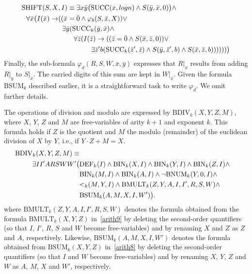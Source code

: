 \documentclass{article}
\begin{document}
\begin{align}
\mathrm{SHIFT}(S, X&, I) \equiv \exists x \bar{y} \big(\mathrm{SUCC}(x, logn) \wedge S(\bar{y}, \bar{x}, 0) \big) \wedge \notag \\
\forall \bar{x} \big(I(\bar{x}) \to &( (\bar{x} = \bar{0} \wedge \varphi_b(S,\bar{x}, X)) \vee \notag \\
&\hspace*{0.2cm} \exists \bar{y} (\mathrm{SUCC}_k(\bar{y},\bar{x}) \wedge \notag \\
&\hspace*{0.8cm} \forall \bar{z} (I(\bar{z}) \to ((\bar{z} = \bar{0} \wedge S(\bar{x}, \bar{z}, 0)) \vee \notag \\
&\hspace*{1.7cm} \exists \bar{z}' b (\mathrm{SUCC}_k(\bar{z}',\bar{z}) \wedge S(\bar{y}, \bar{z}', b) \wedge S(\bar{x}, \bar{z}, b))))))\big)   \label{arith10}  
\end{align}
Finally, the sub-formula $\varphi_d(R, S, W, \bar{x}, \bar{y})$ expresses that $R|_{\bar{x}}$ results from adding $R|_{\bar{y}}$ to $S|_{\bar{x}}$. The carried digits of this sum are kept in $W|_{\bar{x}}$. Given the formula $\mathrm{BSUM}_k$ described earlier, it is a straightforward task to write $\varphi_d$. We omit further details.  

The operations of division and modulo are expressed by $\mathrm{BDIV}_k(X, Y, Z, M)$, where $X$, $Y$, $Z$ and $M$ are free-variables of arity $k+1$ and exponent $k$. This formula holds if $Z$ is the quotient and $M$ the modulo (remainder) of the euclidean division of $X$ by $Y$, i.e., if  $Y\cdot Z + M = X$. 
 \begin{align}
    \mathrm{BDIV}_k(X, Y, Z, M)\equiv \notag \\
\exists I I' A R S W W' \big(&\mathrm{DEF}_k(I) \wedge \mathrm{BIN}_k(X,I) \wedge \mathrm{BIN}_k(Y,I) \wedge \mathrm{BIN}_k(Z,I) \wedge \notag \\
    &\mathrm{BIN}_k(M,I) \wedge \mathrm{BIN}_k(A,I) \wedge \neg \mathrm{BNUM}_k(Y,0,I) \wedge \notag \\
    &{<_k}(M, Y, I) \wedge \mathrm{BMULT}_k(Z, Y, A, I, I', R, S, W) \wedge \notag \\
    &\mathrm{BSUM}_k(A,M,X, I, W')\big). \label{arith11}
\end{align}
where $\mathrm{BMULT}_k(Z, Y, A, I, I', R, S, W)$ denotes the formula obtained from the formula $\mathrm{BMULT}_k(X, Y, Z)$ in~\ref{arith9} by deleting the second-order quantifiers (so that $I$, $I'$, $R$, $S$ and $W$ become free-variables) and by renaming $X$ and $Z$ as $Z$ and $A$, respectively. Likewise, $\mathrm{BSUM}_k(A,M,X, I, W')$ denotes the formula obtained from $\mathrm{BSUM}_k(X, Y, Z)$ in~\ref{arith8} by deleting the second-order quantifiers (so that $I$ and $W$ become free-variables) and by renaming $X$, $Y$, $Z$ and $W$ as $A$, $M$, $X$ and $W'$, respectively.
\end{document}
